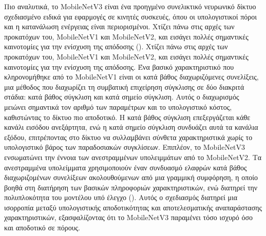 Πιο αναλυτικά, το MobileNetV3 είναι ένα προηγμένο συνελικτικό νευρωνικό δίκτυο σχεδιασμένο ειδικά για εφαρμογές σε κινητές συσκευές, όπου οι υπολογιστικοί πόροι και η κατανάλωση ενέργειας είναι περιορισμένοι. Χτίζει πάνω στις αρχές των προκατόχων του, MobileNetV1 και MobileNetV2, και εισάγει πολλές σημαντικές καινοτομίες για την ενίσχυση της απόδοσης (). Χτίζει πάνω στις αρχές των προκατόχων του, MobileNetV1 και MobileNetV2, και εισάγει πολλές σημαντικές καινοτομίες για την ενίσχυση της απόδοσης. Ένα βασικό χαρακτηριστικό που κληρονομήθηκε από το MobileNetV1 είναι οι κατά βάθος διαχωριζόμενες συνελίξεις, μια μέθοδος που διαχωρίζει τη συμβατική επιχείρηση σύγκλισης σε δύο διακριτά στάδια: κατά βάθος σύγκλιση και κατά σημείο σύγκλιση. Αυτός ο διαχωρισμός μειώνει σημαντικά τον αριθμό των παραμέτρων και το υπολογιστικό κόστος, καθιστώντας το δίκτυο πιο αποδοτικό. Η κατά βάθος σύγκλιση επεξεργάζεται κάθε κανάλι εισόδου ανεξάρτητα, ενώ η κατά σημείο σύγκλιση συνδυάζει αυτά τα κανάλια εξόδου, επιτρέποντας στο δίκτυο να συλλαμβάνει σύνθετα χαρακτηριστικά χωρίς το υπολογιστικό βάρος των παραδοσιακών συγκλίσεων. Επιπλέον, το MobileNetV3 ενσωματώνει την έννοια των ανεστραμμένων υπολειμμάτων από το MobileNetV2. Τα ανεστραμμένα υπολείμματα χρησιμοποιούν έναν συνδυασμό ελαφρών κατά βάθος διαχωριζομένων συνελίξεων ακολουθούμενων από μια γραμμική συμφόρηση, η οποίο βοηθά στη διατήρηση των βασικών πληροφοριών χαρακτηριστικών, ενώ διατηρεί την πολυπλοκότητα του μοντέλου υπό έλεγχο (). Αυτός ο σχεδιασμός διατηρεί μια ισορροπία μεταξύ υπολογιστικής αποδοτικότητας και αποτελεσματικής αναπαράστασης χαρακτηριστικών, εξασφαλίζοντας ότι το MobileNetV3 παραμένει τόσο ισχυρό όσο και αποδοτικό σε πόρους.

